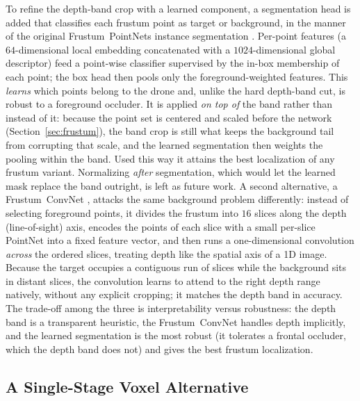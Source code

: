 To refine the depth-band crop with a learned component, a
segmentation head is added that classifies each frustum point as
target or background, in the manner of the original Frustum~PointNets instance
segmentation \cite{qi2018frustum}. Per-point features (a $64$-dimensional local
embedding concatenated with a $1024$-dimensional global descriptor) feed a
point-wise classifier supervised by the in-box membership of each point; the box
head then pools only the foreground-weighted features. This \emph{learns} which
points belong to the drone and, unlike the hard depth-band cut, is robust to a
foreground occluder. It is applied \emph{on top of} the band rather than instead
of it: because the point set is centered and scaled before the network
(Section~\ref{sec:frustum}), the band crop is still what keeps the background tail
from corrupting that scale, and the learned segmentation then weights the pooling
within the band. Used this way it attains the best localization of any frustum
variant. Normalizing \emph{after} segmentation, which would let the learned mask
replace the band outright, is left as future work. A second alternative, a Frustum~ConvNet \cite{wang2019fconvnet}, attacks
the same background problem differently: instead of selecting foreground points,
it divides the frustum into $16$ slices along the depth (line-of-sight) axis,
encodes the points of each slice with a small per-slice PointNet into a fixed
feature vector, and then runs a one-dimensional convolution \emph{across} the
ordered slices, treating depth like the spatial axis of a 1D image. Because the
target occupies a contiguous run of slices while the background sits in distant
slices, the convolution learns to attend to the right depth range natively,
without any explicit cropping; it matches the depth band in accuracy. The
trade-off among the three is interpretability versus robustness: the depth band is
a transparent heuristic, the Frustum~ConvNet handles depth implicitly, and the
learned segmentation is the most robust (it tolerates a frontal occluder, which
the depth band does not) and gives the best frustum localization.

\subsection{A Single-Stage Voxel Alternative}
\label{sec:voxel}

